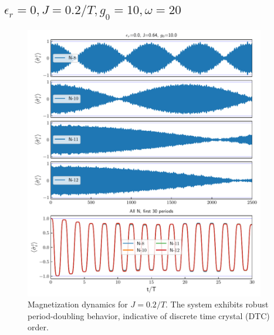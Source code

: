 \documentclass[a4paper, 11pt]{article}
\begin{document}
\subsection{$\epsilon_r = 0, J = 0.2/T, g_0 = 10, \omega = 20$}
\begin{figure}[h!]
    \centering
    \includegraphics[height = 12cm]{time_mag_epsilon_r0.00_J0.64_g10.0_allN.pdf}
    \caption{Magnetization dynamics for $J = 0.2/T$. The system exhibits robust period-doubling behavior, indicative of discrete time crystal (DTC) order.}
\end{figure}






\printbibliography
\end{document}
